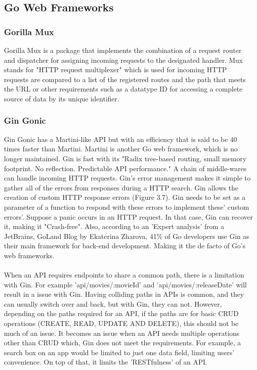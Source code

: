 \subsection{Go Web Frameworks}
\subsubsection{Gorilla Mux}
Gorilla Mux is a package that implements the combination of a request router and dispatcher for assigning incoming requests to the designated handler. Mux stands for "HTTP request multiplexer" which is used for incoming HTTP requests are compared to a list of the registered routes and the path that meets the URL or other requirements such as a datatype ID for accessing a complete source of data by its unique identifier. \cite{ref11}

\subsubsection{Gin Gonic}
Gin Gonic has a Martini-like API but with an efficiency that is said to be 40 times faster than Martini. Martini is another Go web framework, which is no longer maintained. Gin is fast with its "Radix tree-based routing, small memory footprint. No reflection. Predictable API performance." \cite{ref12} A chain of middle-wares can handle incoming HTTP requests. Gin's error management makes it simple to gather all of the errors from responses during a HTTP search. Gin allows the creation of custom HTTP response errors (Figure 3.7). Gin needs to be set as a parameter of a function to respond with these errors to implement these' custom errors'. Suppose a panic occurs in an HTTP request. In that case, Gin can recover it, making it "Crash-free". \cite{ref12} Also, according to an 'Expert analysis' from a JetBrains, GoLand Blog by Ekaterina Zharova, 41\% of Go developers use Gin as their main framework for back-end development. \cite{ref13} Making it the de facto of Go's web frameworks.
\\\\ When an API requires endpoints to share a common path, there is a limitation with Gin. For example 'api/movies/:movieId' and 'api/movies/:releaseDate' will result in a issue with Gin. Having colliding paths in APIs is common, and they can usually switch over and back, but with Gin, they can not. However, depending on the paths required for an API, if the paths are for basic CRUD operations (CREATE, READ, UPDATE AND DELETE), this should not be much of an issue. It becomes an issue when an API needs multiple operations other than CRUD which, Gin does not meet the requirements. For example, a search box on an app would be limited to just one data field, limiting users' convenience. On top of that, it limits the 'RESTfulness' of an API.

